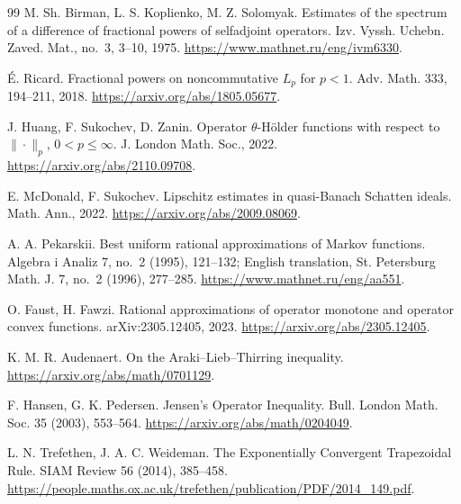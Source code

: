 \documentclass[11pt]{article}
\numberwithin{equation}{section}
\begin{document}
\begin{thebibliography}{99}
M. Sh. Birman, L. S. Koplienko, M. Z. Solomyak.
Estimates of the spectrum of a difference of fractional powers of
selfadjoint operators. Izv. Vyssh. Uchebn. Zaved. Mat., no.~3, 3--10, 1975.
\url{https://www.mathnet.ru/eng/ivm6330}.

\'E. Ricard. Fractional powers on noncommutative $L_p$ for $p<1$.
Adv. Math. 333, 194--211, 2018.
\url{https://arxiv.org/abs/1805.05677}.

J. Huang, F. Sukochev, D. Zanin.
Operator $\theta$-H\"older functions with respect to $\|\cdot\|_p$,
$0<p\le\infty$. J. London Math. Soc., 2022.
\url{https://arxiv.org/abs/2110.09708}.

E. McDonald, F. Sukochev. Lipschitz estimates in quasi-Banach
Schatten ideals. Math. Ann., 2022.
\url{https://arxiv.org/abs/2009.08069}.

A. A. Pekarskii. Best uniform rational approximations of Markov functions.
Algebra i Analiz 7, no.~2 (1995), 121--132;
English translation, St. Petersburg Math. J. 7, no.~2 (1996), 277--285.
\url{https://www.mathnet.ru/eng/aa551}.

O. Faust, H. Fawzi. Rational approximations of operator monotone and
operator convex functions. arXiv:2305.12405, 2023.
\url{https://arxiv.org/abs/2305.12405}.

K. M. R. Audenaert. On the Araki--Lieb--Thirring inequality.
\url{https://arxiv.org/abs/math/0701129}.

F. Hansen, G. K. Pedersen. Jensen's Operator Inequality.
Bull. London Math. Soc. 35 (2003), 553--564.
\url{https://arxiv.org/abs/math/0204049}.

L. N. Trefethen, J. A. C. Weideman.
The Exponentially Convergent Trapezoidal Rule.
SIAM Review 56 (2014), 385--458.
\url{https://people.maths.ox.ac.uk/trefethen/publication/PDF/2014_149.pdf}.
\end{thebibliography}
\end{document}
